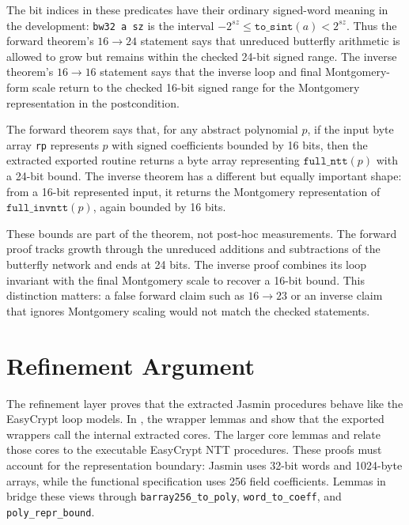 \documentclass[10pt,twocolumn]{article}
\newcommand{\ec}{EasyCrypt}
\newcommand{\jasmin}{Jasmin}
\begin{document}
The bit indices in these predicates have their ordinary signed-word meaning in
the development: \texttt{bw32 a sz} is the interval
\(-2^{sz} \leq \texttt{to\_sint}(a) < 2^{sz}\). Thus the forward theorem's
\(16\to24\) statement says that unreduced butterfly arithmetic is allowed to
grow but remains within the checked 24-bit signed range. The inverse theorem's
\(16\to16\) statement says that the inverse loop and final Montgomery-form scale
return to the checked 16-bit signed range for the Montgomery representation in
the postcondition.

The forward theorem says that, for any abstract polynomial \(p\), if the input
byte array \texttt{rp} represents \(p\) with signed coefficients bounded by 16
bits, then the extracted exported routine returns a byte array representing
\(\texttt{full\_ntt}(p)\) with a 24-bit bound. The inverse theorem has a
different but equally important shape: from a 16-bit represented input, it
returns the Montgomery representation of \(\texttt{full\_invntt}(p)\), again
bounded by 16 bits.

These bounds are part of the theorem, not post-hoc measurements. The forward
proof tracks growth through the unreduced additions and subtractions of the
butterfly network and ends at 24 bits. The inverse proof combines its loop
invariant with the final Montgomery scale to recover a 16-bit bound. This
distinction matters: a false forward claim such as \(16\to 23\) or an inverse
claim that ignores Montgomery scaling would not match the checked statements.

\section{Refinement Argument}

The refinement layer proves that the extracted \jasmin{} procedures behave like
the \ec{} loop models. In , the wrapper lemmas
 and  show that the exported
wrappers call the internal extracted cores. The larger core lemmas
 and  relate those cores to
the executable \ec{} NTT procedures. These proofs must account for the
representation boundary:
\jasmin{} uses 32-bit words and 1024-byte arrays, while the functional
specification uses 256 field coefficients. Lemmas in  bridge
these views through
\texttt{barray256\_to\_poly}, \texttt{word\_to\_coeff}, and
\texttt{poly\_repr\_bound}.
\end{document}
